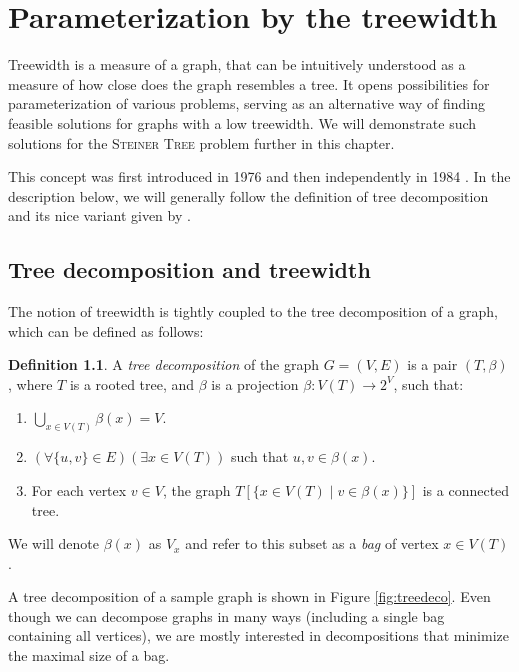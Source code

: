 \documentclass[thesis=M,english,hidelinks]{FITthesis}[2012/10/20]
\theoremstyle{definition}
\newtheorem{definition}{Definition}
\begin{document}

\chapter{Parameterization by the treewidth}

Treewidth is a measure of a graph, that can be intuitively understood as a measure of how close does the graph resembles
a tree. It opens possibilities for parameterization of various problems, serving as an alternative way of finding
feasible solutions for graphs with a low treewidth. We will demonstrate such solutions for the \textsc{Steiner Tree}
problem further in this chapter.

This concept was first introduced in 1976 \cite{Halin1976} and then independently in 1984 \cite{Robertson1984}. In the
description below, we will generally follow the definition of tree decomposition and its nice variant given by
\cite{Cygan2015}.

\section{Tree decomposition and treewidth}

The notion of treewidth is tightly coupled to the tree decomposition of a graph, which can be defined as follows:

\begin{definition}
    \label{def:treedecomposition}
    A \emph{tree decomposition} of the graph $G = (V, E)$ is a pair $(T, \beta)$, where $T$ is a rooted tree, and
    $\beta$ is a projection $\beta: V(T) \rightarrow 2^{V}$, such that:

    \begin{enumerate}
        \item $\bigcup_{x \in V(T)} \beta(x) = V$.
        \item $(\forall \{u, v\} \in E)(\exists x \in V(T))$ such that $u, v \in \beta(x)$.
        \item For each vertex $v \in V$, the graph $T[\{x \in V(T) \mid v \in \beta(x)\}]$ is a connected tree.
    \end{enumerate}
    
    We will denote $\beta(x)$ as $V_x$ and refer to this subset as a \emph{bag} of vertex $x \in V(T)$.
\end{definition}

A tree decomposition of a sample graph is shown in Figure \ref{fig:treedeco}. Even though we can decompose graphs in many
ways (including a single bag containing all vertices), we are mostly interested in decompositions that minimize the
maximal size of a bag. 
\end{document}
